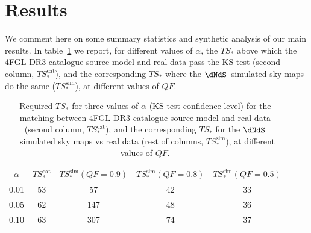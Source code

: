 \section{Results}
\label{sec:catalogue}

We comment here on some summary statistics and synthetic analysis of our main results.
%
In table~\ref{tab:tsstar} we report, for different values of $\alpha$, the 
$TS_*$ above which the 4FGL-DR3 catalogue source model and real data pass the KS test (second column, $TS_*^\textrm{cat}$), and the corresponding $TS_*$ where the $\dNdS$~simulated sky maps do the same ($TS_*^\textrm{sim}$), at different values of $QF$.
\begin{table}[!h]
    \renewcommand{\arraystretch}{1.2}
    \centering
    \begin{tabular}{c|c|c|c|c}   
        $\alpha$ & $TS_*^\textrm{cat}$ & $TS_*^\textrm{sim}(QF=0.9)$& $TS_*^\textrm{sim}(QF=0.8)$&  $TS_*^\textrm{sim}(QF=0.5)$\\
        \hline 
       0.01 & 53 & 57 & 42 & 33\\ 
        \hline 
       0.05 & 62 & 147 & 48 & 36\\ 
        \hline 
       0.10 & 63 & 307 & 74 & 37\\
    \end{tabular}
\caption{Required $TS_*$ for three values of $\alpha$ (KS test confidence level) for the matching between 4FGL-DR3 catalogue source model and real data (second column, $TS_*^\textrm{cat}$), and the corresponding $TS_*$ for the $\dNdS$~simulated sky maps vs real data (rest of columns, $TS_*^\textrm{sim}$), at different values of $QF$.}  
\label{tab:tsstar}
\end{table}

